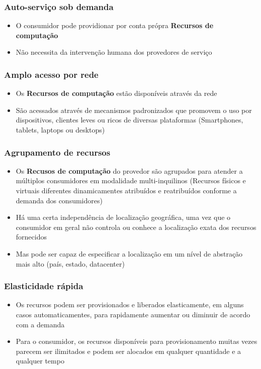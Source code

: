 \begin{frame}
	\frametitle{Auto-serviço sob demanda}
	\begin{itemize}
		\item O consumidor pode providionar por conta própra \textbf{Recursos de computação}
		\item Não necessita da intervenção humana dos provedores de serviço
	\end{itemize}
\end{frame}

\begin{frame}
	\frametitle{Amplo acesso por rede}
	\begin{itemize}
		\item Os \textbf{Recursos de computação} estão disponíveis através da rede
		\item São acessados através de mecanismos padronizados que promovem o uso por dispositivos, clientes leves ou ricos de diversas plataformas (Smartphones, tablets, laptops ou desktops)
	\end{itemize}
\end{frame}

\begin{frame}
	\frametitle{Agrupamento de recursos}
	\begin{itemize}
		\item Os \textbf{Recusos de computação} do provedor são agrupados para atender a múltiplos consumidores em modalidade multi-inquilinos (Recursos físicos e virtuais diferentes dinamicamentes atribuídos e reatribuídos conforme a demanda dos consumidores)
		\item Há uma certa independência de localização geográfica, uma vez que o consumidor em geral não controla ou conhece a localização exata dos recursos fornecidos
		\item Mas pode ser capaz de especificar a localização em um nível de abstração mais alto (país, estado, datacenter)
	\end{itemize}
\end{frame}

\begin{frame}
	\frametitle{Elasticidade rápida}
	\begin{itemize}
		\item Os recursos podem ser provisionados e liberados elasticamente, em alguns casos automaticamentes, para rapidamente aumentar ou diminuir de acordo com a demanda
		\item Para o consumidor, os recursos disponíveis para provisionamento muitas vezes parecem ser ilimitados e podem ser alocados em qualquer quantidade e a qualquer tempo
	\end{itemize}
\end{frame}

